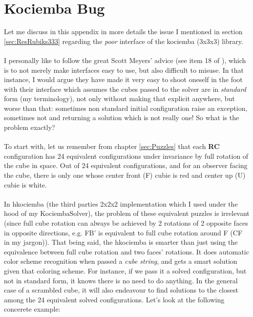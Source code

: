 
\chapter{Kociemba Bug} %

\label{sec:Kociemba} %


Let me discuss in this appendix in more details the issue I mentioned in section \ref{sec:ResRubiks333} regarding the \textit{poor} interface of the kociemba (3x3x3) library.
\\
\\
I personally like to follow the great Scott Meyers' advice (see item 18 of \cite{meyers2005effective}), which is to not merely make interfaces easy to use, but also difficult to misuse. In that instance, I would argue they have made it very easy to shoot oneself in the foot with their interface which assumes the cubes passed to the solver are in \textit{standard} form (my terminology), not only without making that explicit anywhere, but worse than that: sometimes non standard initial configuration raise an exception, sometimes not and returning a solution which is not really one! So what is the problem exactly?
\\
\\
To start with, let us remember from chapter \ref{sec:Puzzles} that each \textbf{RC} configuration has 24 equivalent configurations under invariance by full rotation of the cube in space. Out of 24 equivalent configurations, and for an observer facing the cube, there is only one whose center front (F) cubie is red and center up (U) cubie is white.
\\
\\
In hkociemba (the third parties 2x2x2 implementation which I used under the hood of my KociembaSolver), the problem of these equivalent puzzles is irrelevant (since full cube rotation can always be achieved by 2 rotations of 2 opposite faces in opposite directions, e.g. FB' is equivalent to full cube rotation around F (CF in my jargon)). That being said, the hkociemba is smarter than just using the equivalence between full cube rotation and two faces' rotations. It does automatic color scheme recognition when passed a \textit{cube string}, and gets a smart solution given that coloring scheme. For instance, if we pass it a solved configuration, but not in standard form, it knows there is no need to do anything. In the general case of a scrambled cube, it will also endeavour to find solutions to the closest among the 24 equivalent solved configurations. Let's look at the following concerete example:


